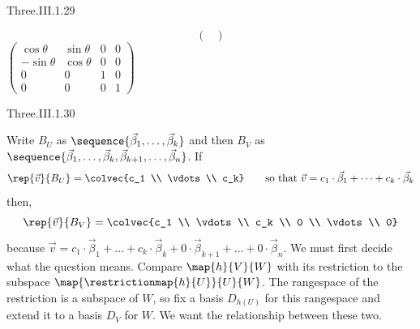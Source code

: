 \begin{ans}{Three.III.1.29}
\begin{exparts}
\begin{equation*}
\begin{pmatrix}
            \end{pmatrix}
         \end{equation*}
        \partsitem
            $\begin{pmatrix}
              \cos\theta  &\sin\theta &0 &0 \\
              -\sin\theta  &\cos\theta  &0 &0 \\
              0           &0           &1 &0 \\
              0           &0           &0 &1
            \end{pmatrix}$
      \end{exparts}
    
\end{ans}
\begin{ans}{Three.III.1.30}
      \begin{exparts}
        \partsitem
          Write \( B_U \) as
          \( \sequence{\vec{\beta}_1,\dots,\vec{\beta}_k} \) and
          then $B_V$ as \( \sequence{\vec{\beta}_1,\dots,\vec{\beta}_k,
                            \vec{\beta}_{k+1},\dots,\vec{\beta}_n} \).
          If
          \begin{equation*}
            \rep{\vec{v}}{B_U}=\colvec{c_1 \\ \vdots \\ c_k}
            \qquad\text{so that\ }
            \vec{v}=c_1\cdot\vec{\beta}_1+\cdots+c_k\cdot\vec{\beta}_k
          \end{equation*}
          then,
          \begin{equation*}
            \rep{\vec{v}}{B_V}=\colvec{c_1 \\ \vdots\\ c_k \\ 0 \\ \vdots \\ 0}
          \end{equation*}
          because $\vec{v}=c_1\cdot\vec{\beta}_1+\dots+c_k\cdot\vec{\beta}_k
                    +0\cdot\vec{\beta}_{k+1}+\dots+0\cdot\vec{\beta}_n$.
        \partsitem
          We must first decide what the question means.
          Compare \( \map{h}{V}{W} \) with its restriction to the subspace
          \( \map{\restrictionmap{h}{U}}{U}{W} \).
          The rangespace of the restriction is a subspace of \( W \), so fix a
          basis \( D_{h(U)} \) for this rangespace and extend it to a basis
          \( D_V \) for \( W \).
          We want the relationship between these two.
          \begin{equation*}

\end{equation*}
\end{exparts}
\end{ans}
